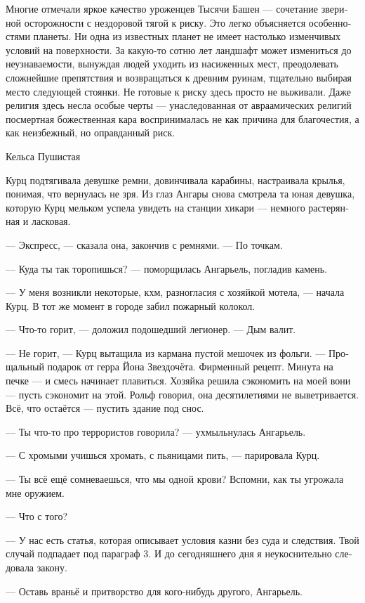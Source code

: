 \documentclass[a4paper,12pt,fleqn]{book}\usepackage{cooltooltips}\usepackage{polyglossia}\setdefaultlanguage[babelshorthands=true]{russian}\setotherlanguage{english}\defaultfontfeatures{Ligatures=TeX,Mapping=tex-text} \usepackage{xcolor}\definecolor{lightgray}{HTML}{bbbbbb}\color{lightgray}\newcommand{\ml}[3]{\textenglish{\textcolor{black}{#3}}}
\begin{document}
\epigraph{Многие отмечали яркое качество уроженцев Тысячи Башен --- сочетание звериной осторожности с нездоровой тягой к риску.
Это легко объясняется особенностями планеты.
Ни одна из известных планет не имеет настолько изменчивых условий на поверхности.
За какую-то сотню лет ландшафт может измениться до неузнаваемости, вынуждая людей уходить из насиженных мест, преодолевать сложнейшие препятствия и возвращаться к древним руинам, тщательно выбирая место следующей стоянки.
Не готовые к риску здесь просто не выживали.
Даже религия здесь несла особые черты --- унаследованная от авраамических религий посмертная божественная кара воспринималась не как причина для благочестия, а как неизбежный, но оправданный риск.
}{Кельса Пушистая}

Курц подтягивала девушке ремни, довинчивала карабины, настраивала крылья, понимая, что вернулась не зря.
Из глаз Ангары снова смотрела та юная девушка, которую Курц мельком успела увидеть на станции хикари --- немного растерянная и ласковая.

--- Экспресс, --- сказала она, закончив с ремнями.
--- По точкам.

--- Куда ты так торопишься? --- поморщилась Ангарьель, погладив камень.

--- У меня возникли некоторые, кхм, разногласия с хозяйкой мотела, --- начала Курц.
В тот же момент в городе забил пожарный колокол.

--- Что-то горит, --- доложил подошедший легионер.
--- Дым валит.

--- Не горит, --- Курц вытащила из кармана пустой мешочек из фольги.
--- Прощальный подарок от герра Йона Звездочёта.
Фирменный рецепт.
Минута на печке --- и смесь начинает плавиться.
Хозяйка решила сэкономить на моей вони --- пусть сэкономит на этой.
Рольф говорил, она десятилетиями не выветривается.
Всё, что остаётся --- пустить здание под снос.

--- Ты что-то про террористов говорила? --- ухмыльнулась Ангарьель.

--- С хромыми учишься хромать, с пьяницами пить, --- парировала Курц.

--- Ты всё ещё сомневаешься, что мы одной крови?
Вспомни, как ты угрожала мне оружием.

--- Что с того?

--- У нас есть статья, которая описывает условия казни без суда и следствия.
Твой случай подпадает под параграф 3.
И до сегодняшнего дня я неукоснительно следовала закону.

--- Оставь враньё и притворство для кого-нибудь другого, Ангарьель.
\end{document}
